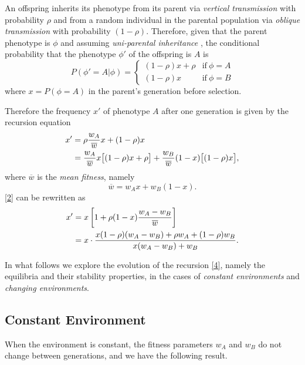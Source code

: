 \documentclass[9pt,twocolumn,twoside,lineno]{pnas-new}
\newcommand{\an}[1]{\begin{align}#1\end{align}}
\begin{document}
An offspring inherits its phenotype from its parent via {\sl vertical transmission} with probability $\rho$ and from a random individual in the parental population via {\sl oblique transmission} with probability $(1-\rho)$. Therefore, given that the parent phenotype is $\phi$ and assuming {\sl uni-parental inheritance} \cite{zefferman2016mothers}, the conditional probability that the phenotype $\phi'$ of the offspring is $A$ is
\begin{equation}
P(\phi' =A|\phi) =\left\{\begin{array}{cc}(1-\rho)x+\rho &\mbox{if}\ \phi=A\\ 
 (1-\rho)x & \mbox{if}\ \phi =B\end{array}\right.
 \end{equation}
 where $x=P(\phi=A)$ in the parent's generation before selection.
 
 Therefore the frequency $x'$ of  phenotype $A$ after one generation is given by the recursion equation
 \begin{equation}
 \begin{aligned}
 x' &=\rho{w_A\over \overline w}x +(1-\rho)x \\
    &= {w_A\over \overline w}x\bigl[(1-\rho)x +\rho\bigr] +{w_B\over \overline w}(1-x)\bigl[(1-\rho)x\bigr],
 \end{aligned}
 \label{2}\end{equation}
 where $\overline w$ is the {\sl mean fitness}, namely
 \begin{equation}\overline w=w_A x+w_B(1-x).\end{equation}
 \eqref{2} can be rewritten as
 \begin{equation}
 \an{
 x' &= x\left[1+\rho(1-x){w_A-w_B\over \overline w}\right] \\
     &=x\cdot{x(1-\rho)(w_A-w_B) +\rho w_A +(1-\rho)w_B\over x(w_A-w_B) +w_B}.}
    \label{4} \end{equation}
 
 In what follows we explore the evolution of the recursion \eqref{4}, namely the equilibria and their stability properties, in the cases of {\sl constant environments} and {\sl changing environments}.

 \subsection{Constant Environment}

When the environment is constant, the fitness parameters $w_A$ and $w_B$ do not change between generations, and we have the following result.
\medskip
\end{document}
